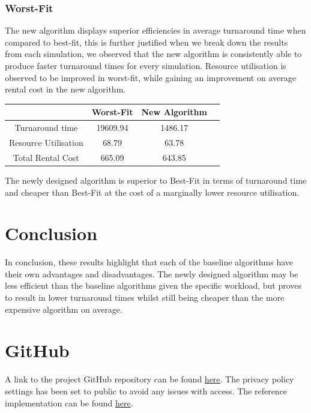 \documentclass[a4paper]{article}
\begin{document}
\subsubsection*{Worst-Fit}
The new algorithm displays superior efficiencies in average turnaround time when compared to best-fit, this is further justified when we break down the results from each simulation, we observed that the new algorithm is consistently able to produce faster turnaround times for every simulation. Resource utilisation is observed to be improved in worst-fit, while gaining an improvement on average rental cost in the new algorithm.

\begin{center}
\begin{tabular}{|c|c|c|c|} 
 \hline
   & Worst-Fit & New Algorithm \\ [0.5ex] 
 \hline
 Turnaround time & 19609.94 & 1486.17 \\ 
 \hline
 Resource Utilisation & 68.79 & 63.78 \\
 \hline
 Total Rental Cost & 665.09 & 643.85 \\
 \hline
\end{tabular}
\end{center}

The newly designed algorithm is superior to Best-Fit in terms of turnaround time and cheaper than Best-Fit at the cost of a marginally lower resource utilisation.

\section{Conclusion}
In conclusion, these results highlight that each of the baseline algorithms have their own advantages and disadvantages. The newly designed algorithm may be less efficient than the baseline algorithms given the specific workload, but proves to result in lower turnaround times whilst still being cheaper than the more expensive algorithm on average.

\section{GitHub}
A link to the project GitHub repository can be found \href{https://github.com/shakeel-mohammed/client-server}{here}.
The privacy policy settings has been set to public to avoid any issues with access. The reference implementation can be found \href{https://github.com/distsys-MQ/ds-sim}{here}.



\end{document}
